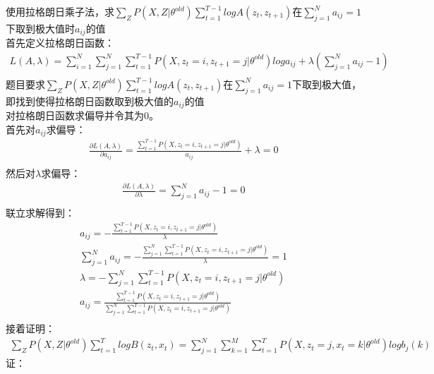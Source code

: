 \documentclass[12pt,a4paper]{article}
\begin{document}
使用拉格朗日乘子法，求$\sum_{Z}P(X,Z|\theta^{old})\sum_{t=1}^{T-1}logA(z_t,z_{t+1})$在$\sum_{j=1}^{N}a_{ij} = 1$下取到极大值时$a_{ij}$的值\\
首先定义拉格朗日函数：
\begin{gather*}
    L(A,\lambda) = \sum_{i=1}^{N}\sum_{j=1}^{N}\sum_{t=1}^{T-1}P(X,z_t = i,z_{t+1} = j|\theta^{old})loga_{ij} + \lambda(\sum_{j=1}^{N}a_{ij} - 1)\\
\end{gather*}
题目要求$\sum_{Z}P(X,Z|\theta^{old})\sum_{t=1}^{T-1}logA(z_t,z_{t+1})$在$\sum_{j=1}^{N}a_{ij} = 1$下取到极大值，即找到使得拉格朗日函数取到极大值的$a_{ij}$的值\\
对拉格朗日函数求偏导并令其为0。\\
首先对$a_{ij}$求偏导：
\begin{gather*}
    \frac{\partial L(A,\lambda)}{\partial a_{ij}} = \frac{\sum_{t=1}^{T-1}P(X,z_t = i,z_{t+1} = j|\theta^{old})}{a_{ij}} + \lambda = 0\\
\end{gather*}
然后对$\lambda$求偏导：
\begin{gather*}
    \frac{\partial L(A,\lambda)}{\partial \lambda} = \sum_{j=1}^{N}a_{ij} - 1 = 0\\
\end{gather*}
联立求解得到：
\begin{gather*}
    a_{ij} = -\frac{\sum_{t=1}^{T-1}P(X,z_t = i,z_{t+1} = j|\theta^{old})}{\lambda}\\
    \sum_{j=1}^{N}a_{ij} = -\frac{\sum_{j=1}^{N}\sum_{t=1}^{T-1}P(X,z_t = i,z_{t+1} = j|\theta^{old})}{\lambda} = 1\\
    \lambda = -\sum_{j=1}^{N}\sum_{t=1}^{T-1}P(X,z_t = i,z_{t+1} = j|\theta^{old})\\
    a_{ij} = \frac{\sum_{t=1}^{T-1}P(X,z_t = i,z_{t+1} = j|\theta^{old})}{\sum_{j=1}^{N}\sum_{t=1}^{T-1}P(X,z_t = i,z_{t+1} = j|\theta^{old})}\\
\end{gather*}
接着证明：
\begin{gather}
    \sum_{Z}P(X,Z|\theta^{old})\sum_{t=1}^{T}logB(z_t,x_t) = \sum_{j=1}^{N}\sum_{k=1}^{M}\sum_{t=1}^{T}P(X,z_t = j,x_t = k|\theta^{old})logb_{j}(k)
\end{gather}
证：
\end{document}
